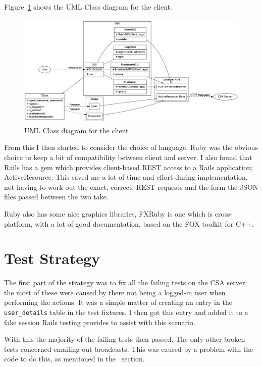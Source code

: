 \documentclass{article}
\begin{document}
Figure~\ref{fig:client-uml-class} shows the UML Class diagram for the client.

\begin{figure}[h]
\centering
\includegraphics[width=.9\textheight, angle=90]{img/client-uml-class.png} 
\caption{UML Class diagram for the client}
\label{fig:client-uml-class}
\end{figure}

From this I then started to consider the choice of language. Ruby was the obvious choice
to keep a bit of compatibility between client and server. I also found that Rails has a
gem which provides client-based REST access to a Rails application; ActiveResource. This
saved me a lot of time and effort during implementation, not having to work out the 
exact, correct, REST requests and the form the JSON files passed between the two take.

Ruby also has some nice graphics libraries, FXRuby is one which is cross-platform, with a
lot of good documentation, based on the FOX toolkit for C++.

\clearpage
\section{Test Strategy}
The first part of the strategy was to fix all the failing tests on the CSA server; the 
most of these were caused by there not being a logged-in user when performing the 
actions. It was a simple matter of creating an entry in the \verb$user_details$ table in
the test fixtures. I then got this entry and added it to a fake session Rails testing
provides to assist with this scenario.\cite{buren07}

With this the majority of the failing tests then passed. The only other broken tests
concerned emailing out broadcasts. This was caused by a problem with the code to do this,
as mentioned in the ~section.
\end{document}
